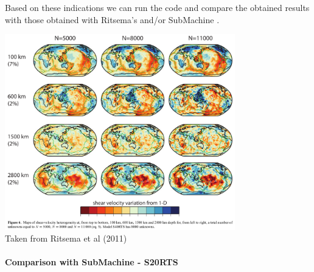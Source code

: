Based on these indications we can run the code and compare the obtained results 
with those obtained with Ritsema's and/or SubMachine \cite{homs18}.

\begin{center}
\includegraphics[width=10cm]{python_codes/fieldstone_85/images/ridv11}\\
{\captionfont Taken from Ritsema et al (2011) \cite{ridv11}}
\end{center}


\newpage
\paragraph{Comparison with SubMachine - S20RTS}

